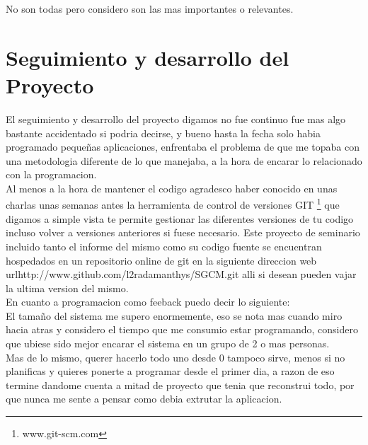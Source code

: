 No son todas pero considero son las mas importantes o relevantes.

\section{Seguimiento y desarrollo del Proyecto}

El seguimiento y desarrollo del proyecto digamos no fue continuo fue mas algo 
bastante accidentado si podria decirse, y bueno hasta la fecha solo habia 
programado peque\~nas aplicaciones, enfrentaba el problema de que me topaba con 
una metodologia diferente de lo que manejaba, a la hora de encarar lo 
relacionado con la programacion. \\[0.1cm]

Al menos a la hora de mantener el codigo agradesco haber conocido en unas charlas
unas semanas antes la herramienta de control de versiones GIT \footnote{www.git-scm.com}
que digamos a simple vista te permite gestionar las diferentes versiones de tu codigo
incluso volver a versiones anteriores si fuese necesario. Este proyecto de seminario
incluido tanto el informe del mismo como su codigo fuente se encuentran hospedados
en un repositorio online de git en la siguiente direccion web 
url{http://www.github.com/l2radamanthys/SGCM.git} alli si desean pueden vajar la ultima
version del mismo.\\[0.1cm]

En cuanto a programacion como feeback puedo decir lo siguiente: \\[0.1cm]

El tama\~no del sistema me supero enormemente, eso se nota mas cuando miro hacia 
atras y considero el tiempo que me consumio estar programando, considero que 
ubiese sido mejor encarar el sistema en un grupo de 2 o mas personas. \\[0.1cm]

Mas de lo mismo, querer hacerlo todo uno desde 0 tampoco sirve, menos si no 
planificas y quieres ponerte a programar desde el primer dia, a razon de eso 
termine dandome cuenta a mitad de proyecto que tenia que reconstrui todo, por que 
nunca me sente a pensar como debia extrutar la aplicacion.


